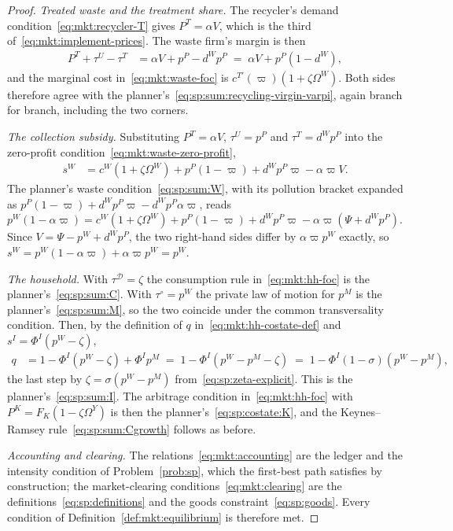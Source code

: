 \begin{proof}
\emph{Treated waste and the treatment share.} The recycler's demand
condition~\eqref{eq:mkt:recycler-T} gives $P^T=\alpha V$, which is the third
of~\eqref{eq:mkt:implement-prices}. The waste firm's margin is then
\begin{align*}
P^T+\tau^U-\tau^T &= \alpha V+p^P-d^Wp^P \;=\; \alpha V+p^P\left(1-d^W\right),
\end{align*}
and the marginal cost in~\eqref{eq:mkt:waste-foc} is
$c^{T\prime}\!\left(\varpi\right)\left(1+\zeta\Omega^W\right)$. Both sides therefore agree with the
planner's~\eqref{eq:sp:sum:recycling-virgin-varpi}, again branch for branch, including the two corners.

\emph{The collection subsidy.} Substituting $P^T=\alpha V$, $\tau^U=p^P$ and $\tau^T=d^Wp^P$
into the zero-profit condition~\eqref{eq:mkt:waste-zero-profit},
\begin{align*}
s^W &= c^W\left(1+\zeta\Omega^W\right)+p^P\left(1-\varpi\right)+d^Wp^P\varpi-\alpha\varpi V .
\end{align*}
The planner's waste condition~\eqref{eq:sp:sum:W}, with its pollution bracket expanded as
$p^P\left(1-\varpi\right)+d^Wp^P\varpi-d^Wp^P\alpha\varpi$, reads
$p^W\left(1-\alpha\varpi\right)=c^W\left(1+\zeta\Omega^W\right)+p^P\left(1-\varpi\right)+d^Wp^P\varpi
-\alpha\varpi\left(\Psi+d^Wp^P\right)$. Since $V=\Psi-p^W+d^Wp^P$, the two right-hand sides differ by
$\alpha\varpi p^W$ exactly, so $s^W=p^W\left(1-\alpha\varpi\right)+\alpha\varpi p^W=p^W$.

\emph{The household.} With $\tau^{\mathcal D}=\zeta$ the consumption rule
in~\eqref{eq:mkt:hh-foc} is the planner's~\eqref{eq:sp:sum:C}. With $\tau^{\circ}=p^W$ the private
law of motion for $p^M$ is the planner's~\eqref{eq:sp:sum:M}, so the two coincide under the common
transversality condition. Then, by the definition of $q$ in~\eqref{eq:mkt:hh-costate-def} and
$s^I=\Phi^I\left(p^W-\zeta\right)$,
\begin{align*}
q &= 1-\Phi^I\left(p^W-\zeta\right)+\Phi^Ip^M
\;=\; 1-\Phi^I\left(p^W-p^M-\zeta\right)
\;=\; 1-\Phi^I\left(1-\sigma\right)\left(p^W-p^M\right),
\end{align*}
the last step by $\zeta=\sigma\left(p^W-p^M\right)$ from~\eqref{eq:sp:zeta-explicit}. This is the
planner's~\eqref{eq:sp:sum:I}. The arbitrage condition in~\eqref{eq:mkt:hh-foc} with
$P^K=F_K\left(1-\zeta\Omega^Y\right)$ is then the planner's~\eqref{eq:sp:costate:K}, and the
Keynes--Ramsey rule~\eqref{eq:sp:sum:Cgrowth} follows as before.

\emph{Accounting and clearing.} The relations~\eqref{eq:mkt:accounting} are the ledger and the
intensity condition of Problem~\ref{prob:sp}, which the first-best path satisfies by construction; the
market-clearing conditions~\eqref{eq:mkt:clearing} are the definitions~\eqref{eq:sp:definitions} and
the goods constraint~\eqref{eq:sp:goods}. Every condition of Definition~\ref{def:mkt:equilibrium} is
therefore met.
\end{proof}

